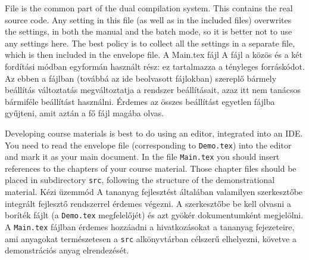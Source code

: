 

\label{sec:compiling}





{
File  is the common part of the dual compilation system. 
This contains the real source code. Any setting in this file (as well as in the included files)
overwrites the settings, in both the manual and the batch mode, so it is better
not to use any settings here. The best policy is to collect all the settings
in a separate file, which is then included in the envelope file.
}
{A Main.tex fájl}
{
A  fájl a közös és a két fordítási módban egyformán használt rész:
ez tartalmazza a tényleges forráskódot. Az ebben a fájlban (továbbá az ide beolvasott fájlokban)
szereplő bármely beállítás változtatás megváltoztatja a rendszer beállításait,
azaz itt nem tanácsos bármiféle beállítást használni. Érdemes az összes beállítást 
egyetlen fájlba gyűjteni, amit aztán a fő fájl magába olvas.
}


{
Developing course materials is best to do using an editor, integrated into an IDE.
You need to read the envelope file (corresponding to \lstinline|Demo.tex|) into the
editor and mark it as your main document. 
In the file \lstinline|Main.tex| you should insert references to the chapters of your course material.
Those chapter files should be placed in subdirectory \lstinline|src|, following the structure of 
the demonstrational material.
}
{Kézi üzemmód}
{
A tananyag fejlesztést általában valamilyen szerkesztőbe integrált fejlesztő rendszerrel
érdemes végezni. A szerkesztőbe be kell olvasni a boríték fájlt (a \lstinline|Demo.tex| megfelelőjét)
és azt gyökér dokumentumként megjelölni.
A \lstinline|Main.tex| fájlban érdemes hozzáadni a hivatkozásokat a tananyag fejezeteire, ami anyagokat
természetesen a \lstinline|src| alkönyvtárban célszerű elhelyezni, követve a demonstrációs anyag elrendezését.
}

